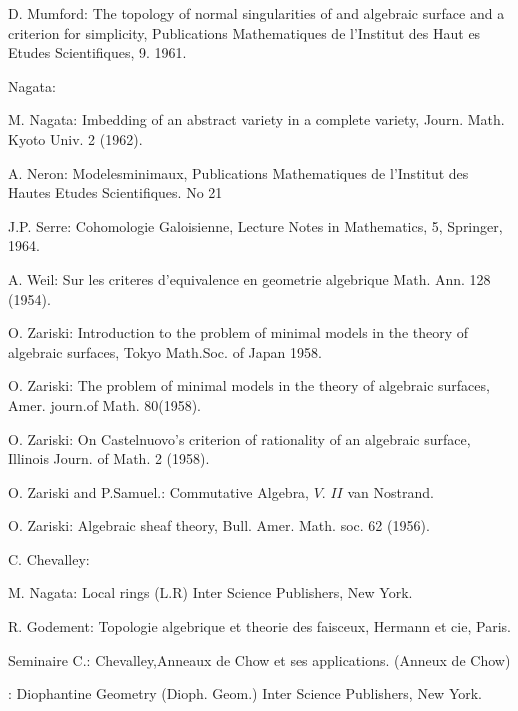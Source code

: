 \begin{thebibliography}{99}
 {D. Mumford}: {The topology of normal singularities of  and
  algebraic surface and a criterion for simplicity, Publications
  Mathematiques de l'Institut des Haut es Etudes Scientifiques,
  9. 1961.} 

 {Nagata}: 

 {M. Nagata}: {Imbedding of an abstract variety in a complete
  variety, Journ. Math. Kyoto Univ. 2 (1962).} 

 {A. Neron}: {Modelesminimaux, Publications Mathematiques de
  l'Institut des Hautes Etudes Scientifiques. No 21} 

 {J.P. Serre}: {Cohomologie Galoisienne, Lecture Notes in
  Mathematics, 5, Springer, 1964.} 

 {A. Weil}: {Sur les criteres d'equivalence en geometrie
  algebrique Math. Ann. 128 (1954).} 

 {O. Zariski}: {Introduction to the problem of minimal
  models in   the theory of algebraic surfaces, Tokyo Math.Soc. of
  Japan 1958.}  

 {O. Zariski}: {The problem of minimal models in the theory of
  algebraic surfaces, Amer. journ.of Math. 80(1958).} 

 {O. Zariski}: {On Castelnuovo's criterion of rationality of
  an algebraic surface, Illinois Journ. of Math. 2 (1958).} 

 {O. Zariski and P.Samuel.}: {Commutative Algebra, $V$. $II$
  van Nostrand. } 

 {O. Zariski}: {Algebraic sheaf theory,
  Bull. Amer. Math. soc. 62 (1956).} 

 {C. Chevalley}: 

 {M. Nagata}: {Local rings (L.R) Inter Science
  Publishers, New   York.} 

 {R. Godement}: {Topologie algebrique et theorie des faisceux,
  Hermann et cie, Paris.} 

 {Seminaire C.}: {Chevalley,Anneaux de Chow et ses
  applications. (Anneux de Chow)} 

: {Diophantine Geometry (Dioph. Geom.) Inter Science
  Publishers, New York.} 


\end{thebibliography}
